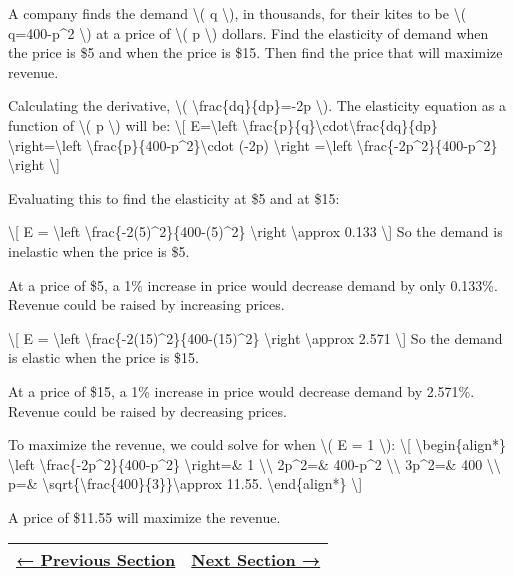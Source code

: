 A company finds the demand \textbackslash{}( q \textbackslash{}), in
thousands, for their kites to be \textbackslash{}( q=400-p\^{}2
\textbackslash{}) at a price of \textbackslash{}( p \textbackslash{})
dollars. Find the elasticity of demand when the price is \$5 and when
the price is \$15. Then find the price that will maximize revenue.

Calculating the derivative, \textbackslash{}(
\textbackslash{}frac\{dq\}\{dp\}=-2p \textbackslash{}). The elasticity
equation as a function of \textbackslash{}( p \textbackslash{}) will be:
\textbackslash{}{[} E=\textbackslash{}left\textbar{}
\textbackslash{}frac\{p\}\{q\}\textbackslash{}cdot\textbackslash{}frac\{dq\}\{dp\}
\textbackslash{}right\textbar{}=\textbackslash{}left\textbar{}
\textbackslash{}frac\{p\}\{400-p\^{}2\}\textbackslash{}cdot (-2p)
\textbackslash{}right\textbar{} =\textbackslash{}left\textbar{}
\textbackslash{}frac\{-2p\^{}2\}\{400-p\^{}2\}
\textbackslash{}right\textbar{} \textbackslash{}{]}

Evaluating this to find the elasticity at \$5 and at \$15:

\textbackslash{}{[} E = \textbackslash{}left\textbar{}
\textbackslash{}frac\{-2(5)\^{}2\}\{400-(5)\^{}2\}
\textbackslash{}right\textbar{} \textbackslash{}approx 0.133
\textbackslash{}{]} So the demand is inelastic when the price is \$5.

At a price of \$5, a 1\% increase in price would decrease demand by only
0.133\%. Revenue could be raised by increasing prices.

\textbackslash{}{[} E = \textbackslash{}left\textbar{}
\textbackslash{}frac\{-2(15)\^{}2\}\{400-(15)\^{}2\}
\textbackslash{}right\textbar{} \textbackslash{}approx 2.571
\textbackslash{}{]} So the demand is elastic when the price is \$15.

At a price of \$15, a 1\% increase in price would decrease demand by
2.571\%. Revenue could be raised by decreasing prices.

To maximize the revenue, we could solve for when \textbackslash{}( E = 1
\textbackslash{}): \textbackslash{}{[} \textbackslash{}begin\{align*\}
\textbackslash{}left\textbar{}
\textbackslash{}frac\{-2p\^{}2\}\{400-p\^{}2\}
\textbackslash{}right\textbar{}=\& 1 \textbackslash{}\textbackslash{}
2p\^{}2=\& 400-p\^{}2 \textbackslash{}\textbackslash{} 3p\^{}2=\& 400
\textbackslash{}\textbackslash{} p=\&
\textbackslash{}sqrt\{\textbackslash{}frac\{400\}\{3\}\}\textbackslash{}approx
11.55. \textbackslash{}end\{align*\} \textbackslash{}{]}

A price of \$11.55 will maximize the revenue.

\begin{longtable}[]{@{}ll@{}}
\toprule
\endhead
\href{section2-9.php}{← Previous Section} & \href{section2-11.php}{Next
Section →}\tabularnewline
\bottomrule
\end{longtable}
